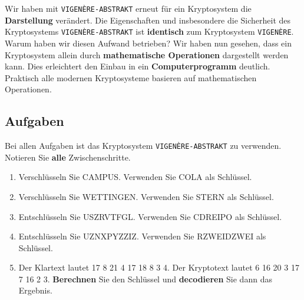 Wir haben mit \texttt{VIGENÈRE-ABSTRAKT} erneut für ein Kryptosystem die \textbf{Darstellung} verändert. Die Eigenschaften und insbesondere die Sicherheit des Kryptosystems \texttt{VIGENÈRE-ABSTRAKT} ist \textbf{identisch} zum Kryptosystem \texttt{VIGENÈRE}. Warum haben wir diesen Aufwand betrieben? Wir haben nun gesehen, dass ein Kryptosystem allein durch \textbf{mathematische Operationen} dargestellt werden kann. Dies erleichtert den Einbau in ein \textbf{Computerprogramm} deutlich. Praktisch alle modernen Kryptosysteme basieren auf mathematischen Operationen.

\subsection{Aufgaben}

Bei allen Aufgaben ist das Kryptosystem \texttt{VIGENÈRE-ABSTRAKT} zu verwenden. Notieren Sie \textbf{alle} Zwischenschritte.

\begin{enumerate}
\item Verschlüsseln Sie CAMPUS. Verwenden Sie COLA als Schlüssel.

\fillwithgrid{2in}

\item Verschlüsseln Sie WETTINGEN. Verwenden Sie STERN als Schlüssel.


\newpage

\item Entschlüsseln Sie USZRVTFGL. Verwenden Sie CDREIPO als Schlüssel.

\fillwithgrid{2.5in}

\item Entschlüsseln Sie UZNXPYZZIZ. Verwenden Sie RZWEIDZWEI als Schlüssel.

\fillwithgrid{2.5in}

\item Der Klartext lautet 17 8 21 4 17 18 8 3 4. Der Kryptotext lautet 6 16 20 3 17 7 16 2 3. \textbf{Berechnen} Sie den Schlüssel und \textbf{decodieren} Sie dann das Ergebnis.


\end{enumerate}

